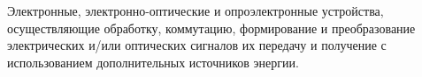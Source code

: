 Электронные, электронно-оптические и опроэлектронные устройства,
осуществляющие обработку, коммутацию, формирование и преобразование
электрических и/или оптических сигналов их передачу и получение с
использованием дополнительных источников энергии.